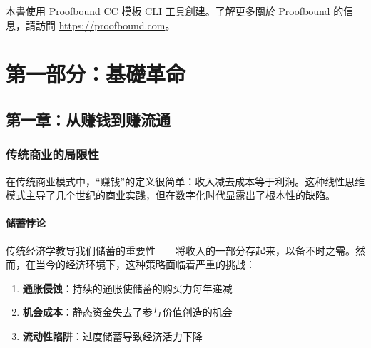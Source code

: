 \documentclass[
  Letterpaper,
]{scrbook}
\providecommand{\tightlist}{%
  \setlength{\itemsep}{0pt}\setlength{\parskip}{0pt}}
\begin{document}
\begin{tcolorbox}[enhanced jigsaw, arc=.35mm, left=2mm, coltitle=black, colbacktitle=quarto-callout-note-color!10!white, opacitybacktitle=0.6, toprule=.15mm, colframe=quarto-callout-note-color-frame, colback=white, titlerule=0mm, bottomrule=.15mm, bottomtitle=1mm, breakable, title=\textcolor{quarto-callout-note-color}{\faInfo}\hspace{0.5em}{關於本書}, toptitle=1mm, leftrule=.75mm, rightrule=.15mm, opacityback=0]

本書使用 Proofbound CC 模板 CLI 工具創建。了解更多關於 Proofbound
的信息，請訪問 \url{https://proofbound.com}。

\end{tcolorbox}

\part{第一部分：基礎革命}

\chapter{第一章：从赚钱到赚流通}\label{sec-earning-circulation}

\section{传统商业的局限性}\label{ux4f20ux7edfux5546ux4e1aux7684ux5c40ux9650ux6027}

在传统商业模式中，``赚钱''的定义很简单：收入减去成本等于利润。这种线性思维模式主导了几个世纪的商业实践，但在数字化时代显露出了根本性的缺陷。

\subsection{储蓄悖论}\label{ux50a8ux84c4ux6096ux8bba}

传统经济学教导我们储蓄的重要性------将收入的一部分存起来，以备不时之需。然而，在当今的经济环境下，这种策略面临着严重的挑战：

\begin{enumerate}
\def\labelenumi{\arabic{enumi}.}
\tightlist
\item
  \textbf{通胀侵蚀}：持续的通胀使储蓄的购买力每年递减
\item
  \textbf{机会成本}：静态资金失去了参与价值创造的机会
\item
  \textbf{流动性陷阱}：过度储蓄导致经济活力下降
\end{enumerate}
\end{document}
